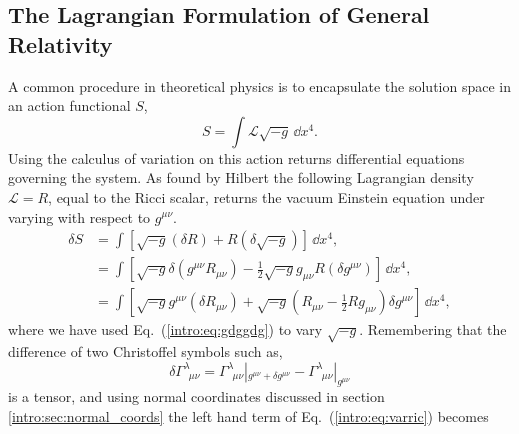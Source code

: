 


\subsection{The Lagrangian Formulation of General Relativity}\label{intro:sec:gr_from_lagrangean}
A common procedure in theoretical physics is to encapsulate the solution space in an action functional $S$,
\begin{equation}
S = \int \mathcal{L} \sqrt{-g} \,\dd x^4.
\end{equation}
Using the calculus of variation on this action returns differential equations governing the system. As found by Hilbert \cite{hilbert1915grundlagen} the following Lagrangian density $\mathcal{L}=R$, equal to the Ricci scalar, returns the vacuum Einstein equation under varying with respect to $g^{\mu\nu}$.
\begin{align}
\delta S &= \int \left[\sqrt{-g} (\delta R) + R (\delta \sqrt{-g})\right]\,\dd x^4, \\
&= \int \left[\sqrt{-g} \delta(g^{\mu\nu}R_{\mu\nu}) -\frac{1}{2} \sqrt{-g} g_{\mu\nu}R (\delta g^{\mu\nu})\right]\,\dd x^4, \\
&= \int \left[\sqrt{-g}g^{\mu\nu}(\delta R_{\mu\nu}) + \sqrt{-g}\left(R_{\mu\nu}-\frac{1}{2}R g_{\mu\nu} \right)\delta g^{\mu\nu}\right]\,\dd x^4 \label{intro:eq:varric},
\end{align}
where we have used Eq.~(\ref{intro:eq:gdggdg}) to vary $\sqrt{-g}$. Remembering that the difference of two Christoffel symbols such as,
\begin{equation}
\delta \Gamma^{\lambda}_{\,\,\,\mu\nu} = \Gamma^{\lambda}_{\,\,\,\mu\nu}|_{g^{\mu\nu}+\delta g^{\mu\nu}} - \Gamma^{\lambda}_{\,\,\,\mu\nu}|_{g^{\mu\nu}}
\end{equation}
is a tensor, and using normal coordinates discussed in section \ref{intro:sec:normal_coords} the left hand term of Eq.~(\ref{intro:eq:varric}) becomes
